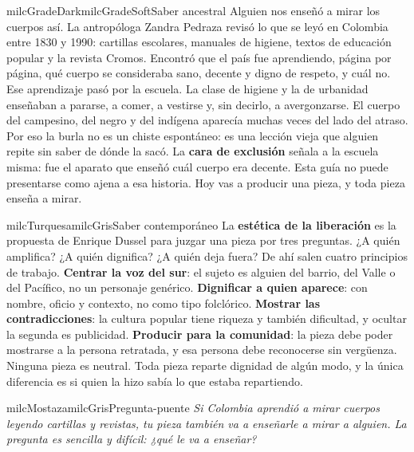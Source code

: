 \documentclass[11pt,letterpaper]{article}
\begin{document}
\begin{softbox}{milcGradeDark}{milcGradeSoft}{Saber ancestral}
Alguien nos enseñó a mirar los cuerpos así. La antropóloga Zandra Pedraza revisó lo que se leyó en Colombia entre 1830 y 1990: cartillas escolares, manuales de higiene, textos de educación popular y la revista Cromos. Encontró que el país fue aprendiendo, página por página, qué cuerpo se consideraba sano, decente y digno de respeto, y cuál no. Ese aprendizaje pasó por la escuela. La clase de higiene y la de urbanidad enseñaban a pararse, a comer, a vestirse y, sin decirlo, a avergonzarse. El cuerpo del campesino, del negro y del indígena aparecía muchas veces del lado del atraso. Por eso la burla no es un chiste espontáneo: es una lección vieja que alguien repite sin saber de dónde la sacó. La \textbf{cara de exclusión} señala a la escuela misma: fue el aparato que enseñó cuál cuerpo era decente. Esta guía no puede presentarse como ajena a esa historia. Hoy vas a producir una pieza, y toda pieza enseña a mirar.\par{}
\end{softbox}

\begin{softbox}{milcTurquesa}{milcGris}{Saber contemporáneo}
La \textbf{estética de la liberación} es la propuesta de Enrique Dussel para juzgar una pieza por tres preguntas. ¿A quién amplifica? ¿A quién dignifica? ¿A quién deja fuera? De ahí salen cuatro principios de trabajo. \textbf{Centrar la voz del sur}: el sujeto es alguien del barrio, del Valle o del Pacífico, no un personaje genérico. \textbf{Dignificar a quien aparece}: con nombre, oficio y contexto, no como tipo folclórico. \textbf{Mostrar las contradicciones}: la cultura popular tiene riqueza y también dificultad, y ocultar la segunda es publicidad. \textbf{Producir para la comunidad}: la pieza debe poder mostrarse a la persona retratada, y esa persona debe reconocerse sin vergüenza. Ninguna pieza es neutral. Toda pieza reparte dignidad de algún modo, y la única diferencia es si quien la hizo sabía lo que estaba repartiendo.
\end{softbox}

\begin{softbox}{milcMostaza}{milcGris}{Pregunta-puente}
\textit{Si Colombia aprendió a mirar cuerpos leyendo cartillas y revistas, tu pieza también va a enseñarle a mirar a alguien. La pregunta es sencilla y difícil: ¿qué le va a enseñar?}
\end{softbox}
\end{document}

